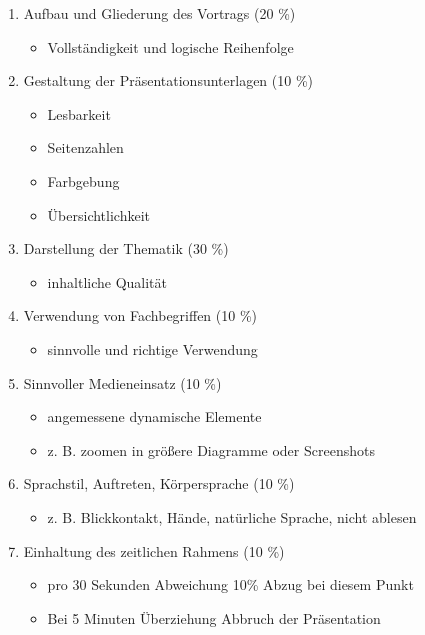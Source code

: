 \begin{enumerate}
    \item Aufbau und Gliederung des Vortrags (20 \%)
    \begin{itemize}
        \item Vollständigkeit und logische Reihenfolge
    \end{itemize}
    \item Gestaltung der Präsentationsunterlagen (10 \%)
    \begin{itemize}
        \item Lesbarkeit
        \item Seitenzahlen
        \item Farbgebung
        \item Übersichtlichkeit
    \end{itemize}
    \item Darstellung der Thematik (30 \%)
    \begin{itemize}
        \item inhaltliche Qualität
    \end{itemize}
    \item Verwendung von Fachbegriffen (10 \%)
    \begin{itemize}
        \item sinnvolle und richtige Verwendung
    \end{itemize}
    \item Sinnvoller Medieneinsatz (10 \%)
    \begin{itemize}
        \item angemessene dynamische Elemente
        \item z. B. zoomen in größere Diagramme oder Screenshots
    \end{itemize}
    \item Sprachstil, Auftreten, Körpersprache (10 \%)
    \begin{itemize}
        \item z. B. Blickkontakt, Hände, natürliche Sprache, nicht ablesen
    \end{itemize}
    \item Einhaltung des zeitlichen Rahmens (10 \%)
    \begin{itemize}
        \item pro 30 Sekunden Abweichung 10\% Abzug bei diesem Punkt
        \item Bei 5 Minuten Überziehung Abbruch der Präsentation
    \end{itemize}
\end{enumerate}
